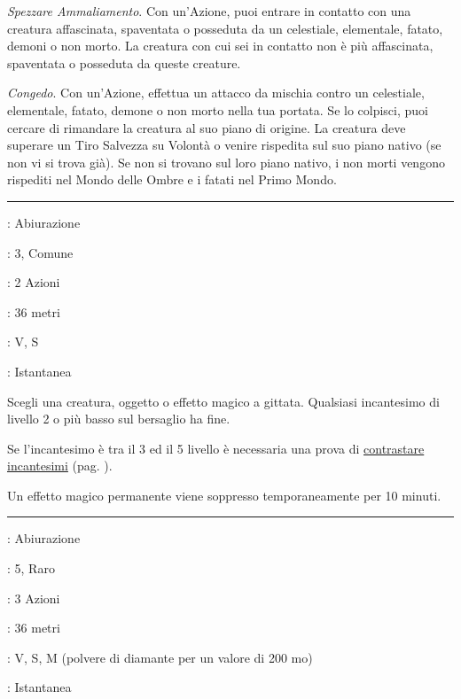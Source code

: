 \begin{multicols}{2}
\emph{Spezzare Ammaliamento}. Con un'Azione, puoi entrare in contatto con una creatura affascinata, spaventata o posseduta da un celestiale, elementale, fatato, demoni o non morto. La creatura con cui sei in contatto non è più affascinata, spaventata o posseduta da queste creature.

\emph{Congedo}. Con un'Azione, effettua un attacco da mischia contro un celestiale, elementale, fatato, demone o non morto nella tua portata. Se lo colpisci, puoi cercare di rimandare la creatura al suo piano di origine. La creatura deve superare un Tiro Salvezza su Volontà o venire rispedita sul suo piano nativo (se non vi si trova già). Se non si trovano sul loro piano nativo, i non morti vengono rispediti nel Mondo delle Ombre e i fatati nel Primo Mondo.

\smallskip\noindent\rule{\linewidth}{2pt} \hypertarget{Dissolvi Magie}{}\smallskip{}\hypertarget{dissolvimagie}{}
\noindent
\begin{description}[noitemsep, topsep=0pt, parsep=0pt, partopsep=0pt, leftmargin=0cm, labelwidth=2.8cm]
	\item[\textbf{Lista di Magia}]: Abiurazione
	\item[\textbf{Livello}]: 3, Comune
	\item[\textbf{T. di Lancio}]: 2 Azioni
	\item[\textbf{Gittata}]: 36 metri
	\item[\textbf{Componenti}]: V, S
	\item[\textbf{Durata}]: Istantanea
\end{description}

Scegli una creatura, oggetto o effetto magico a gittata. Qualsiasi incantesimo di livello 2 o più basso sul bersaglio ha fine.

Se l'incantesimo è tra il 3 ed il 5 livello è necessaria una prova di \hyperlink{contrastareincantesimi}{contrastare incantesimi} (pag. \pageref{contrastareincantesimi}).

Un effetto magico permanente viene soppresso temporaneamente per 10 minuti.

\smallskip\noindent\rule{\linewidth}{2pt} \hypertarget{Dissolvi Magie Avanzato}{}\smallskip{}\hypertarget{dissolvimagieavanzato}{}
\noindent
\begin{description}[noitemsep, topsep=0pt, parsep=0pt, partopsep=0pt, leftmargin=0cm, labelwidth=2.8cm]
	\item[\textbf{Lista di Magia}]: Abiurazione
	\item[\textbf{Livello}]: 5, Raro
	\item[\textbf{T. di Lancio}]: 3 Azioni
	\item[\textbf{Gittata}]: 36 metri
	\item[\textbf{Componenti}]: V, S, M (polvere di diamante per un valore di 200 mo)
	\item[\textbf{Durata}]: Istantanea
\end{description}


\end{multicols}
